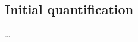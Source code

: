 





\subsection{Initial quantification}
\label{discussion:bulk_corrections:initial_quantification}

\dots

